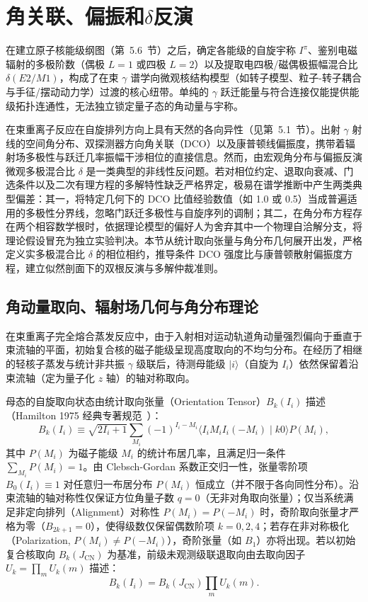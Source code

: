 \section{角关联、偏振和$\delta$反演}\label{sec:5-7}

在建立原子核能级纲图（第~5.6~节）之后，确定各能级的自旋宇称 $I^\pi$、鉴别电磁辐射的多极阶数（偶极 $L=1$ 或四极 $L=2$）以及提取电四极/磁偶极振幅混合比 $\delta(E2/M1)$，构成了在束 $\gamma$ 谱学向微观核结构模型（如转子模型、粒子-转子耦合与手征/摆动动力学）过渡的核心纽带。单纯的 $\gamma$ 跃迁能量与符合连接仅能提供能级拓扑连通性，无法独立锁定量子态的角动量与宇称。

在束重离子反应在自旋排列方向上具有天然的各向异性（见第~5.1~节）。出射 $\gamma$ 射线的空间角分布、双探测器方向角关联（DCO）以及康普顿线偏振度，携带着辐射场多极性与跃迁几率振幅干涉相位的直接信息。然而，由宏观角分布与偏振反演微观多极混合比 $\delta$ 是一类典型的非线性反问题。若对相位约定、退取向衰减、门选条件以及二次有理方程的多解特性缺乏严格界定，极易在谱学推断中产生两类典型偏差：其一，将特定几何下的 DCO 比值经验数值（如 1.0 或 0.5）当成普遍适用的多极性分界线，忽略门跃迁多极性与自旋序列的调制；其二，在角分布方程存在两个相容数学根时，依据理论模型的偏好人为舍弃其中一个物理自洽解分支，将理论假设冒充为独立实验判决。本节从统计取向张量与角分布几何展开出发，严格定义实多极混合比 $\delta$ 的相位相约，推导条件 DCO 强度比与康普顿散射偏振度方程，建立似然剖面下的双根反演与多解仲裁准则。

\subsection{角动量取向、辐射场几何与角分布理论}\label{subsec:5-7-1}

在束重离子完全熔合蒸发反应中，由于入射相对运动轨道角动量强烈偏向于垂直于束流轴的平面，初始复合核的磁子能级呈现高度取向的不均匀分布。在经历了相继的轻核子蒸发与统计非共振 $\gamma$ 级联后，待测母能级 $|i\rangle$（自旋为 $I_i$）依然保留着沿束流轴（定为量子化 $z$ 轴）的轴对称取向。

母态的自旋取向状态由统计取向张量（Orientation Tensor）$B_k(I_i)$ 描述（Hamilton 1975 经典专著规范~\cite{book-hamilton-electromagnetic-interaction}）：
\begin{equation}\label{eq:5-7-bk-def}
B_k(I_i) \equiv \sqrt{2I_i + 1} \sum_{M_i} (-1)^{I_i - M_i} \langle I_i M_i I_i (-M_i) \mid k 0 \rangle P(M_i),
\end{equation}
其中 $P(M_i)$ 为磁子能级 $M_i$ 的统计布居几率，且满足归一条件 $\sum_{M_i} P(M_i) = 1$。由 Clebsch-Gordan 系数正交归一性，张量零阶项 $B_0(I_i) \equiv 1$ 对任意归一布居分布 $P(M_i)$ 恒成立（并不限于各向同性分布）。沿束流轴的轴对称性仅保证方位角量子数 $q = 0$（无非对角取向张量）；仅当系统满足非定向排列（Alignment）对称性 $P(M_i) = P(-M_i)$ 时，奇阶取向张量才严格为零（$B_{2k+1} = 0$），使得级数仅保留偶数阶项 $k = 0, 2, 4$；若存在非对称极化（Polarization, $P(M_i) \ne P(-M_i)$），奇阶张量（如 $B_1$）亦将出现。若以初始复合核取向 $B_k(J_{\mathrm{CN}})$ 为基准，前级未观测级联退取向由去取向因子 $U_k = \prod_m U_k(m)$ 描述：
\begin{equation}\label{eq:5-7-deorientation}
B_k(I_i) = B_k(J_{\mathrm{CN}}) \prod_m U_k(m).
\end{equation}

